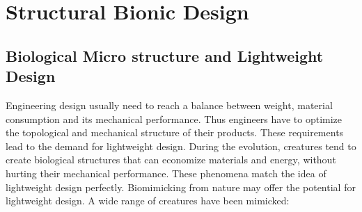 
\chapter{Structural Bionic Design}



\section{Biological Micro structure and Lightweight Design}

Engineering design usually need to reach a balance between weight, material consumption and its mechanical performance. Thus engineers have to optimize the topological and mechanical structure of their products. These requirements lead to the demand for lightweight design. During the evolution, creatures tend to create biological structures that can economize materials and energy, without hurting their mechanical performance. These phenomena match the idea of lightweight design perfectly. Biomimicking from nature may offer the potential for lightweight design. A wide range of creatures have been mimicked:\\
